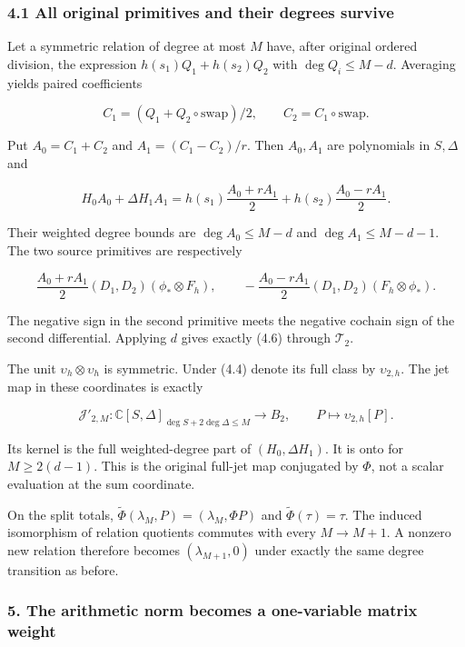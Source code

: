 \subsubsection{4.1 All original primitives and their degrees
survive}\label{spectral_sum_full:all-original-primitives-and-their-degrees-survive}

Let a symmetric relation of degree at most \(M\) have, after original
ordered division, the expression \(h(s_1)Q_1+h(s_2)Q_2\) with
\(\deg Q_i\le M-d\). Averaging yields paired coefficients

\[C_1=(Q_1+Q_2\circ\mathrm{swap})/2,\qquad C_2=C_1\circ\mathrm{swap}.\]

Put \(A_0=C_1+C_2\) and \(A_1=(C_1-C_2)/r\). Then \(A_0,A_1\) are
polynomials in \(S,\Delta\) and

\[H_0A_0+\Delta H_1A_1=h(s_1)\frac{A_0+rA_1}{2}
+h(s_2)\frac{A_0-rA_1}{2}.\tag{4.6}\]

Their weighted degree bounds are \(\deg A_0\le M-d\) and
\(\deg A_1\le M-d-1\). The two source primitives are respectively

\[\frac{A_0+rA_1}{2}(D_1,D_2)(\phi_*\otimes F_h),\qquad
-\frac{A_0-rA_1}{2}(D_1,D_2)(F_h\otimes\phi_*).\tag{4.7}\]

The negative sign in the second primitive meets the negative cochain
sign of the second differential. Applying \(d\) gives exactly (4.6)
through \(\mathcal T_2\).

The unit \(\upsilon_h\otimes\upsilon_h\) is symmetric. Under (4.4)
denote its full class by \(\upsilon_{2,h}\). The jet map in these
coordinates is exactly

\[\mathcal J'_{2,M}:\mathbb C[S,\Delta]_{\deg S+2\deg\Delta\le M}
\longrightarrow B_2,\qquad P\longmapsto\upsilon_{2,h}[P].\tag{4.8}\]

Its kernel is the full weighted-degree part of \((H_0,\Delta H_1)\). It
is onto for \(M\ge2(d-1)\). This is the original full-jet map conjugated
by \(\Phi\), not a scalar evaluation at the sum coordinate.

On the split totals, \(\widetilde\Phi(\lambda_M,P)=(\lambda_M,\Phi P)\)
and \(\widetilde\Phi(\tau)=\tau\). The induced isomorphism of relation
quotients commutes with every \(M\to M+1\). A nonzero new relation
therefore becomes \((\lambda_{M+1},0)\) under exactly the same degree
transition as before.

\subsubsection{5. The arithmetic norm becomes a one-variable matrix
weight}\label{spectral_sum_full:the-arithmetic-norm-becomes-a-one-variable-matrix-weight}

